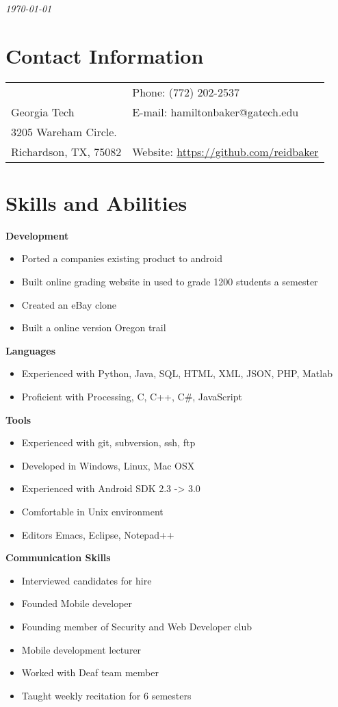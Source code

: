 \documentclass[margin,line]{res}
\begin{document}
 \hfill {\em \today}

\begin{resume}
\section{\sc Contact Information}
\vspace{.05in}
\begin{tabular}{@{}p{3.5in}p{3in}} & {Phone:}  (772) 202-2537 \\
Georgia Tech & {E-mail:}  hamiltonbaker@gatech.edu\\
3205 Wareham Circle. \\
Richardson, TX, 75082  & {Website:} \url{https://github.com/reidbaker}
\end{tabular}
 
\section{\sc Skills and Abilities}
 {\bf Development}
    \begin{itemize}
    \item Ported a companies existing product to android
    \item Built online grading website in used to grade 1200 students a
      semester
    \item Created an eBay clone
    \item Built a online version Oregon trail
    \end{itemize}
 {\bf Languages}
    \begin{itemize}
    \item Experienced with Python, Java, SQL, HTML, XML, JSON,
      PHP, Matlab
    \item Proficient with Processing, C, C++, C\#, JavaScript
    \end{itemize}
 {\bf Tools}
    \begin{itemize}
    \item Experienced with git, subversion, ssh, ftp
    \item Developed in Windows, Linux, Mac OSX
    \item Experienced with Android SDK 2.3 -> 3.0
    \item Comfortable in Unix environment
    \item Editors Emacs, Eclipse, Notepad++
    \end{itemize}
 {\bf Communication Skills}
    \begin{itemize}
    \item Interviewed candidates for hire
    \item Founded Mobile developer
    \item Founding member of Security and Web Developer club
    \item Mobile development lecturer
    \item Worked with Deaf team member
    \item Taught weekly recitation for 6 semesters
    \end{itemize}

\end{resume}
\end{document}
